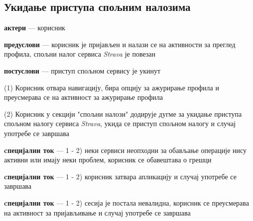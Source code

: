 \documentclass[12pt,oneside]{memoir}
\begin{document}
\subsection{Укидање приступа спољним налозима}
\begin{description}
    \item \textbf{актери} --- корисник
    \item \textbf{предуслови} --- корисник је пријављен и налази се на активности за преглед профила, спољни налог сервиса \textit{Strava} је повезан
    \item \textbf{постуслови} --- приступ спољном сервису је укинут
    \item (1) Корисник отвара навигацију, бира опцију за ажурирање профила и преусмерава се на активност за ажурирање профила
    \item (2) Корисник у секцији "спољни налози" додирује дугме за укидање приступа спољном налогу сервиса \textit{Strava}, укида се приступ спољном налогу и случај употребе се завршава
    \item \textbf{cпецијални ток} --- 1 - 2) неки сервиси неопходни за обављање операције нису активни или имају неки проблем, корисник се обавештава о грешци
    \item \textbf{cпецијални ток} --- 1 - 2) корисник затвара апликацију и случај употребе се завршава
    \item \textbf{cпецијални ток} --- 1 - 2) сесија је постала невалидна, корисник се преусмерава на активност за пријављивање и случај употребе се завршава
\end{description}
\end{document}
